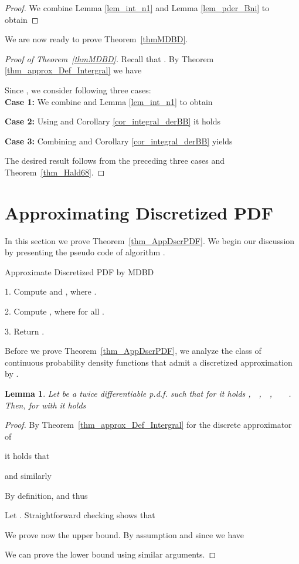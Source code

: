 \documentclass[11pt]{article}
\newtheorem{lem}[thm]{Lemma}
\numberwithin{thm}{section}
\begin{document}
\begin{proof}
We combine Lemma \ref{lem_int_n1} and Lemma \ref{lem_pder_Bni} to obtain

\end{proof}


We are now ready to prove Theorem~\ref{thmMDBD}.

\begin{proof}[Proof of Theorem~\ref{thmMDBD}]
Recall that . By Theorem \ref{thm_approx_Def_Intergral} we have

Since ,
we consider following three cases:\\
\textbf{Case 1:} We combine 
and Lemma \ref{lem_int_n1} to obtain

\textbf{Case 2:} Using 
and Corollary \ref{cor_integral_derBB} it holds

\textbf{Case 3:} Combining 
and Corollary \ref{cor_integral_derBB} yields

The desired result follows from the preceding three cases and Theorem~\ref{thm_Hald68}.
\end{proof}


\section{Approximating Discretized PDF}\label{sec:approxDiscrPDFs}

In this section we prove Theorem~\ref{thm_AppDscrPDF}. We begin our discussion by presenting the pseudo code of algorithm .

\begin{algorithm}[H]
\caption{Approximate Discretized PDF by MDBD}




1. Compute  and , where .

2. Compute ,
where  for all .

3. Return .
\end{algorithm}


Before we prove Theorem~\ref{thm_AppDscrPDF}, we analyze the class of continuous probability density functions that admit a discretized approximation by .

\begin{lem}
\label{lem_RatioLambda} Let  be a twice differentiable p.d.f. such that for  it holds ,\,\,\,\,\,\,,\,\,\,\,\,\,,\,\,\,\,\,\,\,\,\,\,\,\,.
Then, for  with  it holds

\end{lem}

\begin{proof}
By Theorem~\ref{thm_approx_Def_Intergral} for the discrete approximator of 

it holds that

and similarly

By definition, 
and thus

Let . Straightforward checking shows that

We prove now the upper bound. By assumption  and since  we have

We can prove the lower bound  using similar arguments.
\end{proof}
\end{document}
